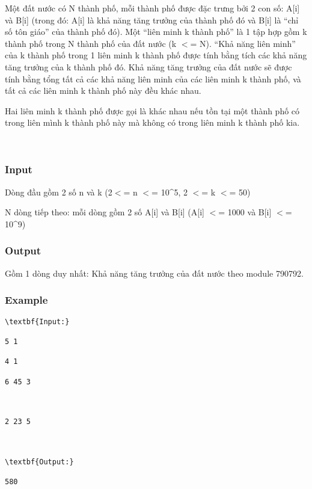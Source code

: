 

Một đất nước có N thành phố, mỗi thành phố được đặc trưng bởi 2 con số: A[i] và B[i] (trong đó: A[i] là khả năng tăng trưởng của thành phố đó và B[i] là “chỉ số tôn giáo” của thành phố đó). Một “liên minh k thành phố” là 1 tập hợp gồm k thành phố trong N thành phố của đất nước (k $<$= N). “Khả năng liên minh” của k thành phố trong 1 liên minh k thành phố được tính bằng tích các khả năng tăng trưởng của k thành phố đó. Khả năng tăng trưởng của đất nước sẽ được tính bằng tổng tất cả các khả năng liên minh của các liên minh k thành phố, và tất cả các liên minh k thành phố này đều khác nhau.

Hai liên minh k thành phố được gọi là khác nhau nếu tồn tại một thành phố có trong liên mình k thành phố này mà không có trong liên minh k thành phố kia.

 

\subsubsection{Input}

Dòng đầu gồm 2 số n và k (2$<$= n $<$= 10\textasciicircum5, 2 $<$= k $<$= 50)

N dòng tiếp theo: mỗi dòng gồm 2 số A[i] và B[i] (A[i] $<$= 1000 và B[i] $<$= 10\textasciicircum9)

\subsubsection{Output}

Gồm 1 dòng duy nhất: Khả năng tăng trưởng của đất nước theo module 790792.

\subsubsection{Example}
\begin{verbatim}
\textbf{Input:}

5 1

4 1

6 45 3



2 23 5



\textbf{Output:}

580

\end{verbatim}
